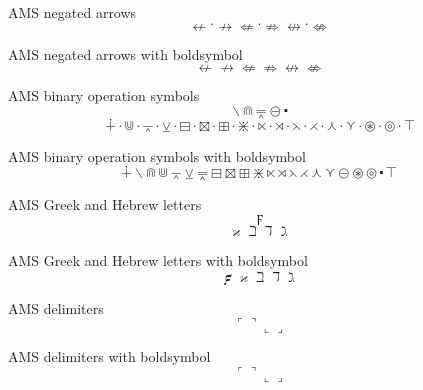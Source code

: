 \documentclass[12pt,a4paper]{article}
\theoremstyle{clearprint}
\begin{document}
\noindent
AMS negated arrows
\begin{equation}
\nleftarrow \cdot \nrightarrow
\nLeftarrow \cdot \nRightarrow
\nleftrightarrow \cdot \nLeftrightarrow
\end{equation}

\noindent
AMS negated arrows with boldsymbol
\begin{equation}
\boldsymbol{\nleftarrow \nrightarrow
\nLeftarrow \nRightarrow
\nleftrightarrow \nLeftrightarrow}
\end{equation}

\noindent
AMS binary operation symbols
\begin{equation}
\smallsetminus \Cap \doublebarwedge \circleddash \centerdot
\end{equation}
\begin{equation}
\dotplus \cdot \Cup \cdot \barwedge \cdot \veebar \cdot \boxminus \cdot \boxtimes \cdot \boxplus \cdot \divideontimes \cdot \ltimes \cdot \rtimes \cdot \leftthreetimes \cdot \rightthreetimes \cdot \curlywedge \cdot \curlyvee \cdot \circledast \cdot \circledcirc \cdot \intercal
\end{equation}

\noindent
AMS binary operation symbols with boldsymbol
\begin{equation}
\boldsymbol{\dotplus \smallsetminus \Cap \Cup \barwedge \veebar \doublebarwedge \boxminus \boxtimes \boxplus \divideontimes \ltimes \rtimes \leftthreetimes \rightthreetimes \curlywedge \curlyvee \circleddash \circledast \circledcirc \centerdot \intercal}
\end{equation}

\noindent
AMS Greek and Hebrew letters
\begin{equation}
\digamma
\end{equation}
\begin{equation}
\varkappa \beth \daleth \gimel 
\end{equation}

\noindent
AMS Greek and Hebrew letters with boldsymbol
\begin{equation}
\boldsymbol{\digamma \varkappa \beth \daleth \gimel} 
\end{equation}

\noindent
AMS delimiters
\begin{equation}
\ulcorner \urcorner \llcorner \lrcorner
\end{equation}

\noindent
AMS delimiters with boldsymbol
\begin{equation}
\boldsymbol{\ulcorner \urcorner \llcorner \lrcorner}
\end{equation}
\end{document}
